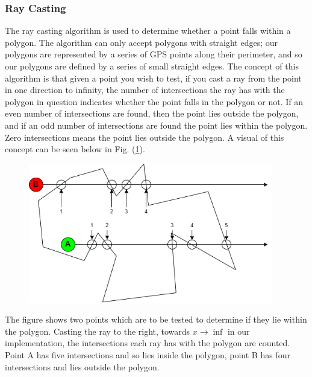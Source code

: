 \documentclass[11pt,landscape]{article}
\begin{document}
\begin{multicols}{3}
\subsubsection{Ray Casting}
The ray casting algorithm is used to determine whether a point falls within a
polygon. The algorithm can only accept polygons with straight edges; our
polygons are represented by a series of GPS points along their perimeter, and so
our polygons are defined by a series of small straight edges. The concept of
this algorithm is that given a point you wish to test, if you cast a ray from
the point in one direction to infinity, the number of intersections the ray has
with the polygon in question indicates whether the point falls in the polygon or
not. If an even number of intersections are found, then the point lies outside
the polygon, and if an odd number of intersections are found the point lies
within the polygon. Zero intersections means the point lies outside the polygon.
A visual of this concept can be seen below in Fig. (\ref{fig:raycasting}).
\begin{figure}[H]
    \begin{mdframed}
        \begin{center}
            \includegraphics[width=0.95\textwidth]{raycasting.png}
        \end{center}
    \end{mdframed}
    \label{fig:raycasting}
\end{figure}

The figure shows two points which are to be tested to determine if they lie
within the polygon. Casting the ray to the right, towards $x\rightarrow\inf$ in
our implementation, the intersections each ray has with the polygon are counted.
Point A has five intersections and so lies inside the polygon, point B has four
intersections and lies outside the polygon. 


\end{multicols}
\end{document}
